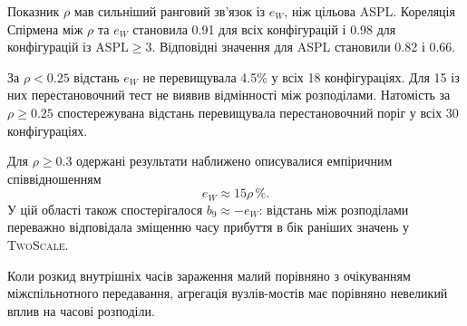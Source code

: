 \documentclass[a4paper,fleqn]{cas-sc}
\newcommand{\TS}{\textup{\textsc{TwoScale}}}
\newcommand{\eW}{e_{W}}
\begin{document}
Показник $\rho$ мав сильніший
ранговий зв'язок із $\eW$,
ніж цільова ASPL.
Кореляція Спірмена між
$\rho$ та $\eW$ становила
0.91 для всіх конфігурацій
і 0.98 для конфігурацій
із $\mathrm{ASPL}\geq3$.
Відповідні значення
для ASPL становили 0.82 і 0.66.

За $\rho<0.25$ відстань $\eW$
не перевищувала 4.5\%
у всіх 18 конфігураціях.
Для 15 із них перестановочний
тест не виявив відмінності
між розподілами.
Натомість за $\rho\geq0.25$
спостережувана відстань
перевищувала перестановочний
поріг у всіх 30 конфігураціях.

Для $\rho\geq0.3$
одержані результати наближено
описувалися емпіричним
співвідношенням
\begin{equation}
\eW \approx 15\rho\,\%.
\end{equation}
У цій області також
спостерігалося
$b_9\approx-\eW$:
відстань між розподілами
переважно відповідала
зміщенню часу прибуття
в бік раніших значень
у \TS{}.

Коли розкид внутрішніх
часів зараження малий
порівняно з очікуванням
міжспільнотного передавання,
агрегація вузлів-мостів
має порівняно невеликий
вплив на часові розподіли.
\end{document}
